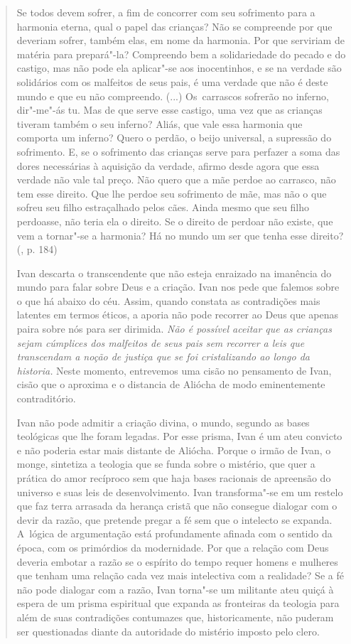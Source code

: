 {\begin{quote}
Se todos devem sofrer, a fim de concorrer com seu sofrimento para a
harmonia eterna, qual o papel das crianças? Não se compreende por que
deveriam sofrer, também elas, em nome da harmonia. Por que serviriam de
matéria para prepará"-la? Compreendo bem a solidariedade do pecado e do
castigo, mas não pode ela aplicar"-se aos inocentinhos, e se na verdade
são solidários com os malfeitos de seus pais, é uma verdade que não é
deste mundo e que eu não compreendo. (...) Os~carrascos sofrerão no
inferno, dir"-me"-ás tu. Mas de que serve esse castigo, uma vez que as
crianças tiveram também o seu inferno? Aliás, que vale essa harmonia que
comporta um inferno? Quero o perdão, o beijo universal, a supressão do
sofrimento. E, se o sofrimento das crianças serve para perfazer a soma
das dores necessárias à aquisição da verdade, afirmo desde agora que
essa verdade não vale tal preço. Não quero que a mãe perdoe ao carrasco,
não tem esse direito. Que lhe perdoe seu sofrimento de mãe, mas não o
que sofreu seu filho estraçalhado pelos cães. Ainda mesmo que seu filho
perdoasse, não teria ela o direito. Se o direito de perdoar não existe,
que vem a tornar"-se a harmonia? Há no mundo um ser que tenha esse
direito? (, p. 184)

Ivan descarta o transcendente que não esteja enraizado na imanência do
mundo para falar sobre Deus e a criação. Ivan nos pede que falemos sobre
o que há abaixo do céu. Assim, quando constata as contradições mais
latentes em termos éticos, a aporia não pode recorrer ao Deus que apenas
paira sobre nós para ser dirimida. \emph{Não é possível aceitar que as
crianças sejam cúmplices dos malfeitos de seus pais sem recorrer a leis
que transcendam a noção de justiça que se foi cristalizando ao longo da
historia.} Neste momento, entrevemos uma cisão no pensamento de Ivan,
cisão que o aproxima e o distancia de Aliócha de modo eminentemente
contraditório.

Ivan não pode admitir a criação divina, o mundo, segundo as bases
teológicas que lhe foram legadas. Por esse prisma, Ivan é um ateu
convicto e não poderia estar mais distante de Aliócha. Porque o irmão de
Ivan, o monge, sintetiza a teologia que se funda sobre o mistério, que
quer a prática do amor recíproco sem que haja bases racionais de
apreensão do universo e suas leis de desenvolvimento. Ivan transforma"-se
em um restelo que faz terra arrasada da herança cristã que não consegue
dialogar com o devir da razão, que pretende pregar a fé sem que o
intelecto se expanda. A~lógica de argumentação está profundamente
afinada com o sentido da época, com os primórdios da modernidade. Por
que a relação com Deus deveria embotar a razão se o espírito do tempo
requer homens e mulheres que tenham uma relação cada vez mais
intelectiva com a realidade? Se a fé não pode dialogar com a razão, Ivan
torna"-se um militante ateu quiçá à espera de um prisma espiritual que
expanda as fronteiras da teologia para além de suas contradições
contumazes que, historicamente, não puderam ser questionadas diante da
autoridade do mistério imposto pelo clero.


\end{quote}}
